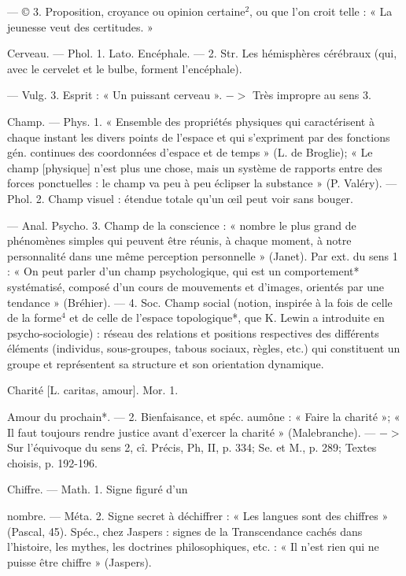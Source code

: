 — © 3. Proposition, croyance
ou opinion certaine$^2$, ou que l’on
croit telle : « La jeunesse veut des
certitudes. »

Cerveau. — Phol. 1. Lato. Encéphale.
— 2. Str. Les hémisphères cérébraux
(qui, avec le cervelet et le bulbe, forment l’encéphale).

— Vulg. 3. Esprit : « Un puissant cerveau ». $->$ Très impropre
au sens 3.


Champ. — Phys. 1. « Ensemble des
propriétés physiques qui caractérisent à chaque instant les divers
points de l’espace et qui s'expriment
par des fonctions gén. continues des
coordonnées d’espace et de temps »
(L. de Broglie); « Le champ [physique] n’est plus une chose, mais un
système de rapports entre des forces
ponctuelles : le champ va peu à peu
éclipser la substance » (P. Valéry).
— Phol. 2. Champ visuel : étendue totale qu’un œil peut voir sans bouger.

— Anal. Psycho. 3. Champ de la
conscience : « nombre le plus grand
de phénomènes simples qui peuvent
être réunis, à chaque moment, à
notre personnalité dans une même
perception personnelle » (Janet).
Par ext. du sens 1 : « On peut parler
d’un champ psychologique, qui est
un comportement*  systématisé,
composé d’un cours de mouvements
et d'images, orientés par une tendance » (Bréhier). — 4. Soc. Champ
social (notion, inspirée à la fois de
celle de la forme$^4$ et de celle de
l’espace topologique*, que K. Lewin
a introduite en psycho-sociologie) :
réseau des relations et positions respectives des différents éléments
(individus, sous-groupes, tabous sociaux, règles, etc.) qui constituent
un groupe et représentent sa structure et son orientation dynamique.

Charité [L. caritas, amour]. Mor. 1.

Amour du prochain*. — 2. Bienfaisance, et spéc. aumône : « Faire la
charité »; « Il faut toujours rendre
justice avant d'exercer la charité »
(Malebranche). — $->$ Sur l'équivoque du sens 2, cî. Précis, Ph, II,
p. 334; Se. et M., p. 289; Textes
choisis, p. 192-196.

Chiffre. — Math. 1. Signe figuré d’un

nombre. — Méta. 2. Signe secret à
déchiffrer : « Les langues sont des
chiffres » (Pascal, 45). Spéc., chez
Jaspers : signes de la Transcendance
cachés dans l’histoire, les mythes,
les doctrines philosophiques, etc. :
« Il n'est rien qui ne puisse être
chiffre » (Jaspers).

